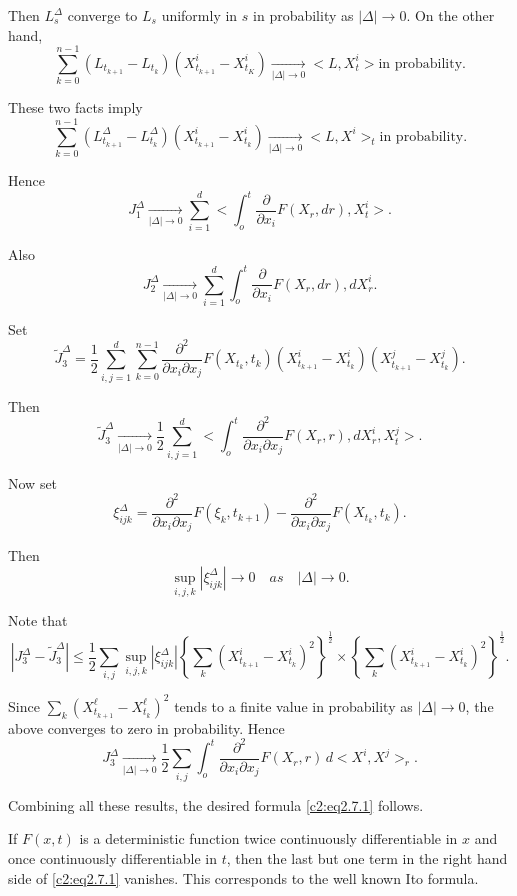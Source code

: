 Then $L_s^{\Delta}$ converge to $L_s$ uniformly in $s$ in probability
as $|\Delta|\to 0$. On the other hand, 
$$
\sum_{k=0}^{n-1} (L_{t_{k+1}} - L_{t_k}) (X^i_{t_{k+1}}-  X^i_{t_K}) 
\xrightarrow[|\Delta| \rightarrow0] {} <L, X^i_t> \text{in
  probability}. 
$$

These two facts imply
$$
\sum_{k=0}^{n-1} (L_{t_{k+1}}^{\Delta} - L_{t_k}^{\Delta})
(X^i_{t_{k+1}} - X^i_{t_k}) \xrightarrow[|\Delta| \rightarrow0] {} <L,
X^i>_t \text{in probability}. 
$$

Hence
$$
J_1^{\Delta} \xrightarrow[|\Delta| \rightarrow0] {}   \sum_{i=1}^d
<\int_o^t \frac{\partial}{\partial x_i} F(X_r, dr), X^i_t>. 
$$

Also
$$
J_2^{\Delta} \xrightarrow[|\Delta| \rightarrow 0] {} \sum_{i=1}^d
\int_o^t \frac{\partial}{\partial x_i} F(X_r, dr),dX^i_r. 
$$

Set\pageoriginale
$$
\tilde{J}_3^{\Delta} = \frac{1}{2} \sum_{i,j = 1}^d  \sum_{k=0}^{n-1}
\frac{\partial^2}{\partial x_i \partial x_j} F(X_{t_k}, t_k)
(X^i_{t_{k+1}}  - X^i_{t_{k}} ) (X^j_{t_{k+1}}  - X^j_{t_{k}} ). 
$$

Then
$$
\tilde{J}_3^{\Delta} \xrightarrow[|\Delta| \rightarrow 0]{}
\frac{1}{2} \sum_{i,j=1}^d <\int_o^t \frac{\partial^2}{\partial x_i
  \partial x_j} F(X_r, r),dX^i_r, X^j_t>.  
$$

Now set
$$
\xi^{\Delta}_{ijk} =  \frac{\partial^2}{\partial x_i \partial x_j}
F(\xi_k, t_{k+1}) - \frac{\partial^2}{\partial x_i \partial x_j}
F(X_{t_k}, t_k).  
$$

Then
$$
\sup_{i,j,k} |\xi_{ijk}^{\Delta}| \to 0 \quad as \quad |\Delta| \to 0. 
$$

Note that
$$ 
|J_3^{\Delta}- \tilde{J}_3^{\Delta}| \le \frac{1}{2} \sum_{i,j}
\sup_{i,j,k} |\xi_{ijk}^{\Delta}| \left\{ \sum_k (X^i_{t_{k+1}} -
X^i_{t_k})^2 \right\}^{\frac{1}{2}} \times  \left\{ \sum_k (X^i_{t_{k+1}} -
X^i_{t_{k}})^2 \right\}^{\frac{1}{2}}. 
$$

Since $\sum_k (X^{\ell}_{t_{k+1}} - X^{\ell}_{t_k} )^2$ tends to a
finite value in probability as $|\Delta| \to 0$, the above converges
to zero in probability. Hence 
$$
J_3^{\Delta} \xrightarrow[|\Delta| \rightarrow 0]{} \frac{1}{2} 
\sum_{i,j} \int_o^t \frac{\partial^2}{\partial x_i \partial x_j}
F(X_r, r) \, d<X^i, X^j>_r. 
$$

Combining all these results, the desired formula \eqref{c2:eq2.7.1} follows.

\setcounter{remark}{1}
\begin{remark}\label{c2:rem2.7.2}%
  If $F(x, t)$ is a deterministic function twice continuously
  differentiable in $x$ and once continuously differentiable in $t$,
  then the last but one term in the right hand side of \eqref{c2:eq2.7.1}
  vanishes. This corresponds to the well known Ito formula. 
\end{remark}


